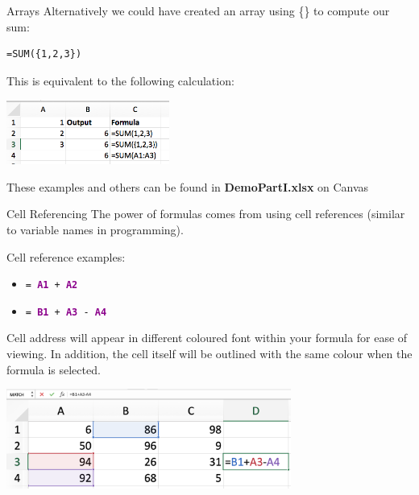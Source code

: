 \documentclass[xcolor=svgnames]{beamer}
\newcommand{\cell}[1]{{\sf \textbf{\textcolor{DarkMagenta}{#1}}}}
\begin{document}
\begin{frame}[fragile]{Arrays}
Alternatively we could have created an array using \{\} to compute our sum:
\begin{verbatim}
=SUM({1,2,3})
\end{verbatim}
This is equivalent to the following calculation:
\begin{center}
\includegraphics[width=0.4\textwidth]{img/sumarray.png}
\end{center}
These examples and others can be found in {\bf DemoPartI.xlsx} on Canvas
\end{frame}



\begin{frame}{Cell Referencing}
The power of formulas comes from using cell references (similar to variable names in programming). \par \vspace{3mm}  

Cell reference examples: 
\begin{itemize}
\item {\tt = \cell{A1} + \cell{A2}}
\item {\tt = \cell{B1} + \cell{A3} - \cell{A4}}
\end{itemize}
\medskip
Cell address will appear in different coloured font within your formula for ease of viewing.  In addition, the cell itself will be outlined with the same colour when the formula is selected.
\begin{center}
\includegraphics[width=0.7\textwidth]{img/colours}
\end{center}
\end{frame}
\end{document}
